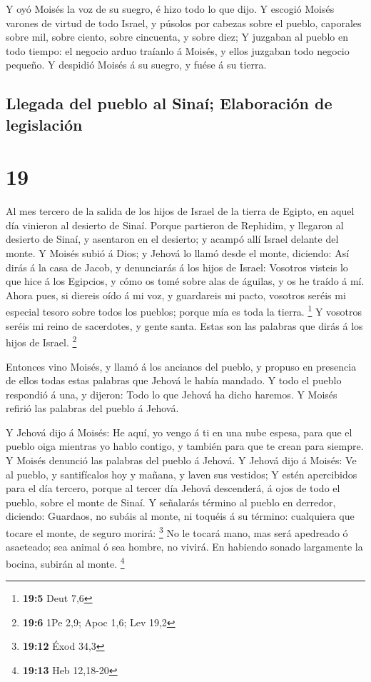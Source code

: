  Y oyó Moisés la voz de su suegro, é hizo todo lo que dijo.
 Y escogió Moisés varones de virtud de todo Israel, y
púsolos por cabezas sobre el pueblo, caporales sobre mil, sobre ciento,
sobre cincuenta, y sobre diez;  Y juzgaban al pueblo en
todo tiempo: el negocio arduo traíanlo á Moisés, y ellos juzgaban todo
negocio pequeño.  Y despidió Moisés á su suegro, y fuése á
su tierra.

\hypertarget{llegada-del-pueblo-al-sinauxed-elaboraciuxf3n-de-legislaciuxf3n}{%
\subsection{Llegada del pueblo al Sinaí; Elaboración de
legislación}\label{llegada-del-pueblo-al-sinauxed-elaboraciuxf3n-de-legislaciuxf3n}}

\hypertarget{section-18}{%
\section{19}\label{section-18}}

 Al mes tercero de la salida de los hijos de Israel de la
tierra de Egipto, en aquel día vinieron al desierto de Sinaí.
 Porque partieron de Rephidim, y llegaron al desierto de
Sinaí, y asentaron en el desierto; y acampó allí Israel delante del
monte.  Y Moisés subió á Dios; y Jehová lo llamó desde el
monte, diciendo: Así dirás á la casa de Jacob, y denunciarás á los hijos
de Israel:  Vosotros visteis lo que hice á los Egipcios, y
cómo os tomé sobre alas de águilas, y os he traído á mí. 
Ahora pues, si diereis oído á mi voz, y guardareis mi pacto, vosotros
seréis mi especial tesoro sobre todos los pueblos; porque mía es toda la
tierra. \footnote{\textbf{19:5} Deut 7,6}  Y vosotros seréis
mi reino de sacerdotes, y gente santa. Estas son las palabras que dirás
á los hijos de Israel. \footnote{\textbf{19:6} 1Pe 2,9; Apoc 1,6; Lev
  19,2}

 Entonces vino Moisés, y llamó á los ancianos del pueblo, y
propuso en presencia de ellos todas estas palabras que Jehová le había
mandado.  Y todo el pueblo respondió á una, y dijeron: Todo
lo que Jehová ha dicho haremos. Y Moisés refirió las palabras del pueblo
á Jehová.

 Y Jehová dijo á Moisés: He aquí, yo vengo á ti en una nube
espesa, para que el pueblo oiga mientras yo hablo contigo, y también
para que te crean para siempre. Y Moisés denunció las palabras del
pueblo á Jehová.  Y Jehová dijo á Moisés: Ve al pueblo, y
santifícalos hoy y mañana, y laven sus vestidos;  Y estén
apercibidos para el día tercero, porque al tercer día Jehová descenderá,
á ojos de todo el pueblo, sobre el monte de Sinaí.  Y
señalarás término al pueblo en derredor, diciendo: Guardaos, no subáis
al monte, ni toquéis á su término: cualquiera que tocare el monte, de
seguro morirá: \footnote{\textbf{19:12} Éxod 34,3}  No le
tocará mano, mas será apedreado ó asaeteado; sea animal ó sea hombre, no
vivirá. En habiendo sonado largamente la bocina, subirán al monte.
\footnote{\textbf{19:13} Heb 12,18-20}

